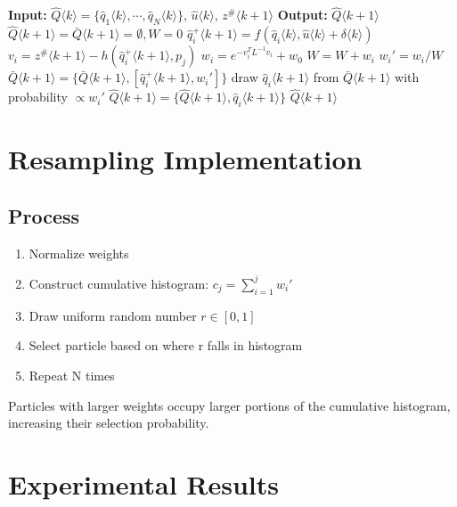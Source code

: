 \documentclass[openany]{book}
\theoremstyle{definition}
\theoremstyle{remark}
\newcommand{\note}[1]{
\begin{tcolorbox}[colback=green!5,colframe=green!40!black,title=Note]
 #1
\end{tcolorbox}
}
\begin{document}
\begin{algorithmic}[1]
\State \textbf{Input:} $\hat{Q}\langle k \rangle = \{\hat{q}_1\langle k \rangle, \cdots, \hat{q}_N\langle k \rangle\}$, $\hat{u}\langle k \rangle$, $z^\#\langle k+1 \rangle$
\State \textbf{Output:} $\hat{Q}\langle k+1 \rangle$
\State $\hat{Q}\langle k+1 \rangle = \bar{Q}\langle k+1 \rangle = \emptyset, W = 0$
   \State $\hat{q}_i^+\langle k+1 \rangle = f(\hat{q}_i\langle k \rangle, \hat{u}\langle k \rangle + \delta\langle k \rangle)$
   \State $v_i = z^\#\langle k+1 \rangle - h(\hat{q}_i^+\langle k+1 \rangle, p_j)$
   \State $w_i = e^{-v_i^T L^{-1}v_i} + w_0$
   \State $W = W + w_i$
\EndFor
{}
   \State $w_i' = w_i/W$
   \State $\bar{Q}\langle k+1 \rangle = \{\bar{Q}\langle k+1 \rangle, [\hat{q}_i^+\langle k+1 \rangle, w_i']\}$
\EndFor
{}
   \State draw $\hat{q}_i\langle k+1 \rangle$ from $\bar{Q}\langle k+1 \rangle$ with probability $\propto w_i'$
   \State $\hat{Q}\langle k+1 \rangle = \{\hat{Q}\langle k+1 \rangle, \hat{q}_i\langle k+1 \rangle\}$
\EndFor
\State \Return $\hat{Q}\langle k+1 \rangle$
\end{algorithmic}

\section{Resampling Implementation}

\subsection{Process}
\begin{enumerate}
   \item Normalize weights
   \item Construct cumulative histogram: $c_j = \sum_{i=1}^j w_i'$
   \item Draw uniform random number $r \in [0,1]$
   \item Select particle based on where r falls in histogram
   \item Repeat N times
\end{enumerate}

\note{Particles with larger weights occupy larger portions of the cumulative histogram, increasing their selection probability.}

\section{Experimental Results}
\end{document}
